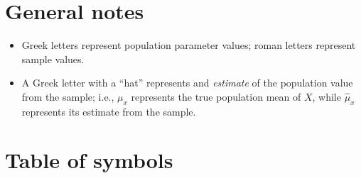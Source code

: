 \documentclass[]{book}
\begin{document}
\hypertarget{general-notes}{%
\section{General notes}\label{general-notes}}

\begin{itemize}
\item
  Greek letters represent population parameter values; roman letters represent sample values.
\item
  A Greek letter with a ``hat'' represents and \emph{estimate} of the population value from the sample; i.e., \(\mu_x\) represents the true population mean of \(X\), while \(\hat{\mu}_x\) represents its estimate from the sample.
\end{itemize}

\hypertarget{table-of-symbols}{%
\section{Table of symbols}\label{table-of-symbols}}
\end{document}
